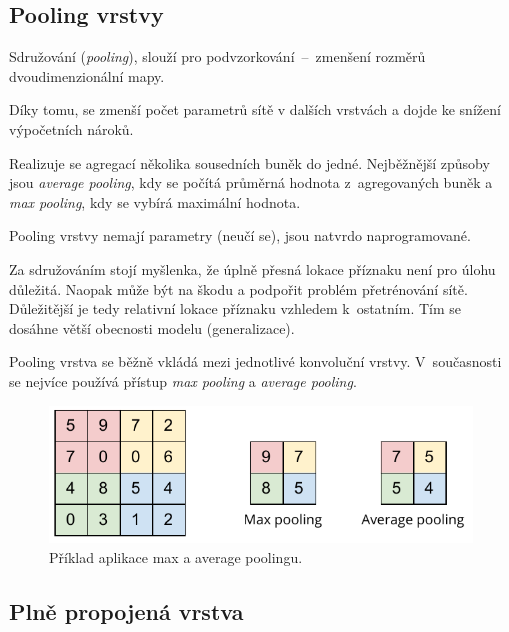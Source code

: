 \subsection{Pooling vrstvy}

\begin{compactitem}
    \item Sdružování (\textit{pooling}), slouží pro podvzorkování~--~zmenšení rozměrů dvoudimenzionální mapy.

    \item Díky tomu, se zmenší počet parametrů sítě v dalších vrstvách a dojde ke snížení výpočetních nároků.

    \item Realizuje se agregací několika sousedních buněk do jedné. Nejběžnější způsoby jsou \textit{average pooling}, kdy se počítá průměrná hodnota z~agregovaných buněk a \textit{max pooling}, kdy se vybírá maximální hodnota.

    \item Pooling vrstvy nemají parametry (neučí se), jsou natvrdo naprogramované.

    \item Za sdružováním stojí myšlenka, že úplně přesná lokace příznaku není pro úlohu důležitá. Naopak může být na škodu a podpořit problém přetrénování sítě. Důležitější je tedy relativní lokace příznaku vzhledem k~ostatním. Tím se dosáhne větší obecnosti modelu (generalizace).

    \item Pooling vrstva se běžně vkládá mezi jednotlivé konvoluční vrstvy. V~současnosti se nejvíce používá přístup \textit{max pooling} a \textit{average pooling}.
\end{compactitem}

\begin{figure}[H]
    \centering
    \includegraphics[width=0.7\linewidth]{pooling.pdf}
    \caption{Příklad aplikace max a average poolingu.}
\end{figure}

\subsection{Plně propojená vrstva}

